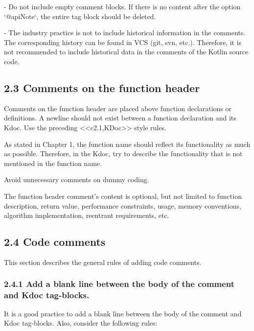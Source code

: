 - Do not include empty comment blocks. If there is no content after the option `@apiNote`, the entire tag block should be deleted.

- The industry practice is not to include historical information in the comments. The corresponding history can be found in VCS (git, svn, etc.). Therefore, it is not recommended to include historical data in the comments of the Kotlin source code.



\subsection*{\textbf{2.3 Comments on the function header}}



Comments on the function header are placed above function declarations or definitions. A newline should not exist between a function declaration and its Kdoc. Use the preceding <<c2.1,KDoc>> style rules.



As stated in Chapter 1, the function name should reflect its functionality as much as possible. Therefore, in the Kdoc, try to describe the functionality that is not mentioned in the function name.

Avoid unnecessary comments on dummy coding.



The function header comment's content is optional, but not limited to function description, return value, performance constraints, usage, memory conventions, algorithm implementation, reentrant requirements, etc.



\subsection*{\textbf{2.4 Code comments}}



This section describes the general rules of adding code comments.



\subsubsection*{\textbf{2.4.1 Add a blank line between the body of the comment and Kdoc tag-blocks.}}
\leavevmode\newline



It is a good practice to add a blank line between the body of the comment and Kdoc tag-blocks. Also, consider the following rules:

